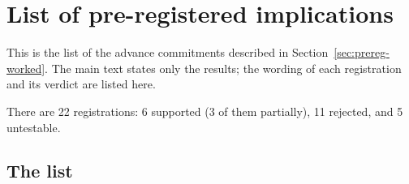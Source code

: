 \chapter{List of pre-registered implications}
\label{app:prereg}

This is the list of the advance commitments described in Section~\ref{sec:prereg-worked}. The
main text states only the results; the wording of each registration and its verdict are listed
here.

There are 22 registrations: 6 supported (3 of them partially), 11 rejected, and 5 untestable.

\section{The list}

